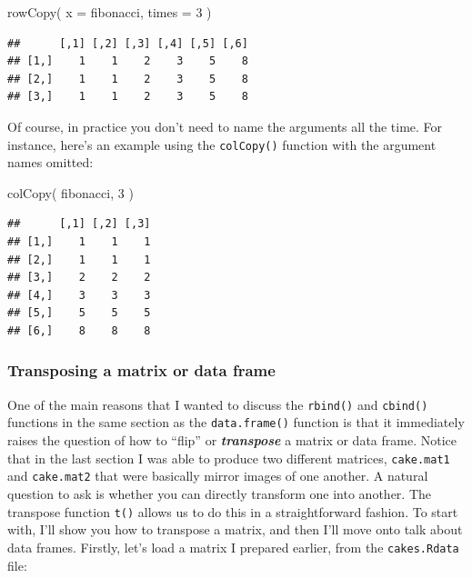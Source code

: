 \documentclass[
]{book}
\newenvironment{Shaded}{\begin{snugshade}}{\end{snugshade}}
\newcommand{\AttributeTok}[1]{\textcolor[rgb]{0.77,0.63,0.00}{#1}}
\newcommand{\DecValTok}[1]{\textcolor[rgb]{0.00,0.00,0.81}{#1}}
\newcommand{\FunctionTok}[1]{\textcolor[rgb]{0.00,0.00,0.00}{#1}}
\newcommand{\NormalTok}[1]{#1}
\begin{document}
\begin{Shaded}
\begin{Highlighting}[]
\FunctionTok{rowCopy}\NormalTok{( }\AttributeTok{x =}\NormalTok{ fibonacci, }\AttributeTok{times =} \DecValTok{3}\NormalTok{ )}
\end{Highlighting}
\end{Shaded}

\begin{verbatim}
##      [,1] [,2] [,3] [,4] [,5] [,6]
## [1,]    1    1    2    3    5    8
## [2,]    1    1    2    3    5    8
## [3,]    1    1    2    3    5    8
\end{verbatim}

Of course, in practice you don't need to name the arguments all the time. For instance, here's an example using the \texttt{colCopy()} function with the argument names omitted:

\begin{Shaded}
\begin{Highlighting}[]
\FunctionTok{colCopy}\NormalTok{( fibonacci, }\DecValTok{3}\NormalTok{ )}
\end{Highlighting}
\end{Shaded}

\begin{verbatim}
##      [,1] [,2] [,3]
## [1,]    1    1    1
## [2,]    1    1    1
## [3,]    2    2    2
## [4,]    3    3    3
## [5,]    5    5    5
## [6,]    8    8    8
\end{verbatim}

\hypertarget{transposing-a-matrix-or-data-frame}{%
\subsubsection{Transposing a matrix or data frame}\label{transposing-a-matrix-or-data-frame}}

One of the main reasons that I wanted to discuss the \texttt{rbind()} and \texttt{cbind()} functions in the same section as the \texttt{data.frame()} function is that it immediately raises the question of how to ``flip'' or \textbf{\emph{transpose}} a matrix or data frame. Notice that in the last section I was able to produce two different matrices, \texttt{cake.mat1} and \texttt{cake.mat2} that were basically mirror images of one another. A natural question to ask is whether you can directly transform one into another. The transpose function \texttt{t()} allows us to do this in a straightforward fashion. To start with, I'll show you how to transpose a matrix, and then I'll move onto talk about data frames. Firstly, let's load a matrix I prepared earlier, from the \texttt{cakes.Rdata} file:
\end{document}
